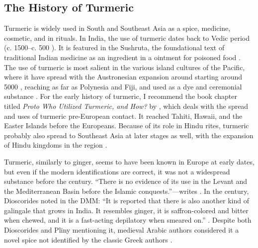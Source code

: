 

\subsection{The History of Turmeric}

Turmeric is widely used in South and Southeast Asia as a spice, medicine, cosmetic, and in rituals. In India, the use of turmeric dates back to Vedic period (c. 1500--c. 500 \BC). It is featured in the \gls{Sushruta}, the foundational text of traditional Indian medicine as an ingredient in a ointment for poisoned food \autocite{prasad_turmeric_2011}. The use of turmeric is most salient in the various island cultures of the Pacific, where it have spread with the Austronesian expansion around starting around 5000 \BP, reaching as far as Polynesia and Fiji, and used as a dye and ceremonial substance \autocite{mcclatchey_traditional_1993,sopher_indigenous_1964,prance_cultural_2005}. For the early history of turmeric, I recommend the book chapter titled \textit{Proto Who Utilized Turmeric, and How?} by \textcite{kikusawa_proto_2007}, which deals with the spread and uses of turmeric pre-European contact. It reached Tahiti, Hawaii, and the Easter Islands before the Europeans. Because of its role in Hindu rites, turmeric probably also spread to Southeast Asia at later stages as well, with the expansion of Hindu kingdoms in the region \autocite[170]{prance_cultural_2005}.

Turmeric, similarly to ginger, seems to have been known in Europe at early dates, but even if the modern identifications are correct, it was not a widespread substance before the  century. ``There is no evidence of its use in the Levant and the Mediterranean Basin before the Islamic conquests.''---writes \textcite[108]{amar_arabian_2017}. In the  century, Dioscorides noted in the \gls{DMM}: ``It is reported that there is also another kind of galingale that grows in India. It resembles ginger, it is saffron-colored and bitter when chewed, and it is a fast-acting depilatory when smeared on.'' \autocite{dioscorides_materia_2005}. Despite both Dioscorides and Pliny mentioning it, medieval Arabic authors considered it a novel spice not identified by the classic Greek authors \autocite[108]{amar_arabian_2017}. 

